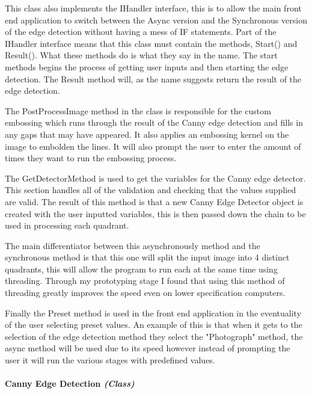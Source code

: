 \begin{FlushLeft}
    This class also implements the IHandler interface, this is to allow the main front end application to switch between the Async version and the Synchronous version of the edge detection without having a mess of IF statements. Part of the IHandler interface means that this class must contain the methods, Start() and Result(). What these methods do is what they say in the name. The start methods begins the process of getting user inputs and then starting the edge detection. The Result method will, as the name suggests return the result of the edge detection. \\ \bk

    The PostProcessImage method in the class is responsible for the custom embossing which runs through the result of the Canny edge detection and fills in any gaps that may have appeared. It also applies an embossing kernel on the image to embolden the lines. It will also prompt the user to enter the amount of times they want to run the embossing process. \\ \bk
    
    The GetDetectorMethod is used to get the variables for the Canny edge detector. This section handles all of the validation and checking that the values supplied are valid. The result of this method is that a new Canny Edge Detector object is created with the user inputted variables, this is then passed down the chain to be used in processing each quadrant. \\ \bk

    The main differentiator between this asynchronously method and the synchronous method is that this one will split the input image into 4 distinct quadrants, this will allow the program to run each at the same time using threading. Through my prototyping stage I found that using this method of threading greatly improves the speed even on lower specification computers. \\ \bk
    
    Finally the Preset method is used in the front end application in the eventuality of the user selecting preset values. An example of this is that when it gets to the selection of the edge detection method they select the "Photograph" method, the async method will be used due to its speed however instead of prompting the user it will run the various stages with predefined values. \\

    \bk
    \pagebreak
    \paragraph{Canny Edge Detection \textit{(Class)}} \mbox{} \\


\end{FlushLeft}
